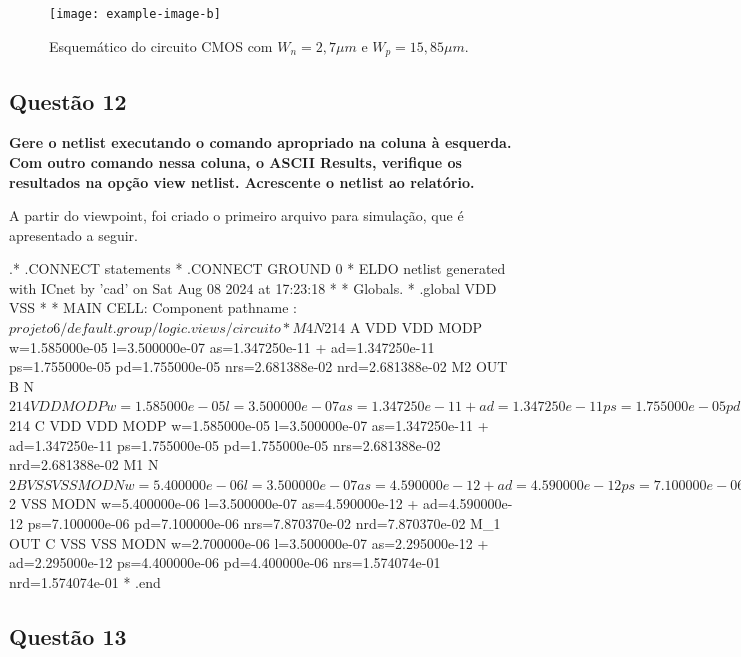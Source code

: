 ﻿\documentclass[12pt,a4paper]{article}
\begin{document}
\begin{figure}[H]
    \centering
    \texttt{[image: example-image-b]}
    \caption{Esquemático do circuito CMOS com $W_n = 2,7 \mu m$ e $W_p = 15,85 \mu m$.}
    \label{fig:cmos_schematic}
\end{figure}

\subsection*{Questão 12}

	\textbf{Gere o netlist executando o comando apropriado na coluna à esquerda. Com outro comando nessa coluna, o ASCII Results, verifique os resultados na opção view netlist. Acrescente o netlist ao relatório.}

A partir do viewpoint, foi criado o primeiro arquivo para simulação, que é apresentado a seguir.


\begin{codeblock}[title={Exemplo de Netlist}, label={lst:netlist}, listing options={language=TeX}]
.* .CONNECT statements
*
.CONNECT GROUND 0
* ELDO netlist generated with ICnet by 'cad' on Sat Aug 08 2024 at 17:23:18
*
* Globals.
*
.global VDD VSS
*
* MAIN CELL: Component pathname :
$projeto6/default.group/logic.views/circuito
*
M4 N$214 A VDD VDD MODP w=1.585000e-05 l=3.500000e-07
as=1.347250e-11
+ ad=1.347250e-11 ps=1.755000e-05 pd=1.755000e-05 nrs=2.681388e-02
nrd=2.681388e-02
M2 OUT B N$214 VDD MODP w=1.585000e-05 l=3.500000e-07
as=1.347250e-11
+ ad=1.347250e-11 ps=1.755000e-05 pd=1.755000e-05 nrs=2.681388e-02
nrd=2.681388e-02
M3 N$214 C VDD VDD MODP w=1.585000e-05 l=3.500000e-07
as=1.347250e-11
+ ad=1.347250e-11 ps=1.755000e-05 pd=1.755000e-05 nrs=2.681388e-02
nrd=2.681388e-02
M1 N$2 B VSS VSS MODN w=5.400000e-06 l=3.500000e-07 as=4.590000e-12
+ ad=4.590000e-12 ps=7.100000e-06 pd=7.100000e-06 nrs=7.870370e-02
nrd=7.870370e-02
M_2 OUT A N$2 VSS MODN w=5.400000e-06 l=3.500000e-07
as=4.590000e-12
+ ad=4.590000e-12 ps=7.100000e-06 pd=7.100000e-06 nrs=7.870370e-02
nrd=7.870370e-02
M_1 OUT C VSS VSS MODN w=2.700000e-06 l=3.500000e-07
as=2.295000e-12
+ ad=2.295000e-12 ps=4.400000e-06 pd=4.400000e-06 nrs=1.574074e-01
nrd=1.574074e-01
*
.end
\end{codeblock}

\subsection*{Questão 13}
\end{document}
